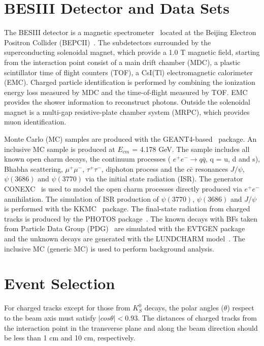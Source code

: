 \documentclass[aps,prd,twocolumn,showpacs,amsmath,amssymb]{revtex4-1}
\begin{document}
    \section{BESIII Detector and Data Sets}
    \label{sec:detector_dataset}
    The BESIII detector is a magnetic spectrometer~\cite{BESIII} located at the Beijing Electron Positron Collider (BEPCII)~\cite{BEPCII}.
    The subdetectors surrounded by the superconducting solenoidal magnet, which provide a 1.0 T magnetic field, starting from the interaction point consist of  a main drift chamber (MDC), a plastic scintillator time of flight counters (TOF), a CsI(Tl) electromagnetic calorimeter (EMC).
Charged particle identification is performed by combining the ionization energy loss  measured by MDC and the time-of-flight measured by TOF.
EMC provides the shower information to reconstruct photons.
Outside the solenoidal magnet is a multi-gap resistive-plate chamber system (MRPC), which provides muon identification.

Monte Carlo (MC) samples are produced with the GEANT4-based~\cite{GEANT4} package.
An inclusive MC sample is produced at $E_{cm}$ = 4.178 GeV.
The sample includes all known open charm decays, the continuum processes ( $e^{+}e^{-} \rightarrow q\bar{q}$, q = u, d and s), Bhabha scattering, $\mu^{+}\mu^{-}$, $\tau^{+}\tau^{-}$, diphoton process and the $c\bar{c}$ resonances $J/\psi$, $\psi(3686)$ and $\psi(3770)$ via the initial state radiation (ISR).
The generator CONEXC~\cite{CONEXC} is used to model the open charm processes directly produced via $e^{+}e^{-}$ annihilation.
The simulation of ISR production of $\psi(3770)$, $\psi(3686)$ and $J/\psi$ is performed with the KKMC~\cite{KKMC} package.
The final-state radiation from charged tracks is produced by the PHOTOS package~\cite{PHOTOS}.
The known decays with BFs taken from Particle Data Group (PDG)~\cite{PDG} are simulated with the EVTGEN package~\cite{EVTGEN} and
the unknown decays are generated with the LUNDCHARM model~\cite{LUNDCHARM}.
The inclusive MC (generic MC) is used to perform background analysis. 
\section{Event Selection}
\label{chap:event_selection}
For charged tracks except for those from $K_{S}^{0}$ decays, the polar angles ($\theta$) respect to the beam axis  must satisfy $|cos\theta| < 0.93$.
The distances of charged tracks from the interaction point in the transverse plane and along the beam direction should be less than 1 cm and 10 cm, respectively.
\end{document}
